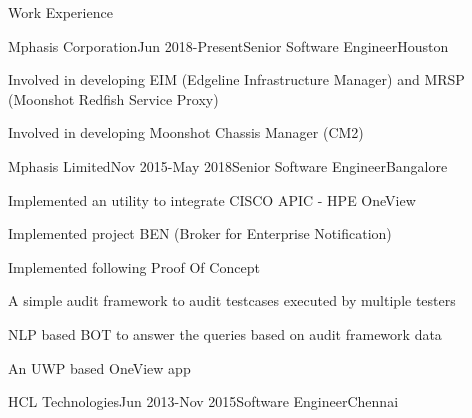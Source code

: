 \documentclass{resume} %
\begin{document}
\begin{rSection}{ Work Experience } \itemsep -1pt        

\begin{rSubsection}{Mphasis Corporation}{Jun 2018-Present}{Senior Software Engineer}{Houston}    

\vspace{-3pt}

\item Involved in developing EIM (Edgeline Infrastructure Manager) and MRSP (Moonshot Redfish Service Proxy)
\item Involved in developing Moonshot Chassis Manager (CM2)
\end{rSubsection} 

\vspace{-4pt}


\begin{rSubsection}{Mphasis Limited}{Nov 2015-May 2018}{Senior Software Engineer}{Bangalore}    

\vspace{-3pt}

\item Implemented an utility to integrate CISCO APIC - HPE OneView 
\item Implemented project BEN (Broker for Enterprise Notification)
\item Implemented following Proof Of Concept
\begin{list}{}{}
\vspace{-5pt}
\item A simple audit framework to audit testcases executed by multiple testers
\vspace{-5pt}
\item NLP based BOT to answer the queries based on audit framework data
\vspace{-5pt}
\item An UWP based OneView app
\end{list}
\end{rSubsection} 

\vspace{-4pt}


\begin{rSubsection}{HCL Technologies}{Jun 2013-Nov 2015}{Software Engineer}{Chennai}    

\vspace{-3pt}


\end{rSubsection}
\end{rSection}
\end{document}

